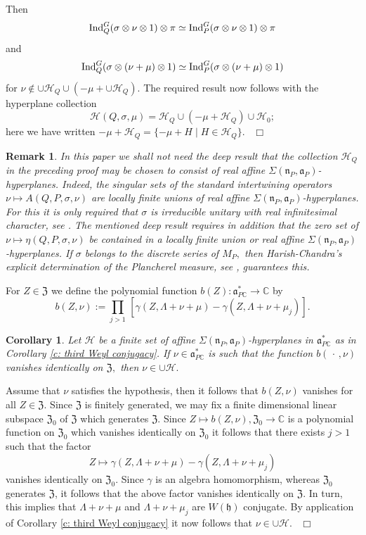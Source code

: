 \documentclass[12pt,a4paper]{article}
\newtheorem{Cor}[Thm]{Corollary}
\newtheorem{Rem}[Thm]{Remark}
\newenvironment{cor}[0]{\begin{Cor}\noindent}%
{\end{Cor}}
\newenvironment{rem}[0]{\begin{Rem}\noindent\rm}%
{\end{Rem}}
\def\proof{\par\noindent{\it Proof.}{\ }{\ }}
\def\qed{~\hfill\hbox{$\Box$}\medbreak}
\def\msy#1{{\mathbb #1}}
\def\C{{\msy C}}
\def\gg{\gamma}
\def\gs{\sigma}
\def\gS{\Sigma}
\def\got#1{\mathfrak #1}
\def\fa{{\got a}}
\def\fh{{\got h}}
\def\fn{{\got n}}
\def\to{\rightarrow}
\def\iC{{\scriptscriptstyle \C}}
\def\cH{{\mathcal H}}
\numberwithin{Thm}{section}
\numberwithin{equation}{section}
\def\Ind{{\rm Ind}}
\def\dotvar{\, \cdot\,}
\def\fZ{{\mathfrak Z}}
\def\faPdc{{\fa_{P\iC}^*}}
\def\gL{\Lambda}
\numberwithin{equation}{section}
\def\fZ{{\mathfrak Z}}
\def\gL{\Lambda}
\def\faPdc{\fa_{P\iC}^*}
\def\fh{{\mathfrak h}}
\def\faP{\fa_P}
\def\bfhyp{hyperplanes}
\begin{document}
Then 
$$
\Ind_Q^G(\gs \otimes \nu \otimes 1) \otimes \pi \simeq \Ind_P^G(\gs \otimes \nu \otimes 1) \otimes \pi 
$$ 
and 
$$ 
\Ind_Q^G(\gs \otimes (\nu + \mu) \otimes 1)\simeq \Ind_P^G(\gs \otimes (\nu + \mu) \otimes 1)
$$ 
for $\nu \notin \cup \cH_Q \cup (-\mu + \cup \cH_Q).$ The required result now follows
with the hyperplane collection 
$$ 
\cH(Q,\gs, \mu) = \cH_Q \cup (-\mu + \cH_Q) \cup \cH_0;
$$ 
here we have written $- \mu + \cH_Q = \{-\mu + H \mid H\in \cH_Q\}$.
\qed

\begin{rem}
In this paper we shall not need the deep result that the collection 
$\cH_Q$ in the preceding proof 
may be chosen to consist of real affine $\gS(\fn_P,\faP)$-hyperplanes. 
Indeed, the singular sets of the standard intertwining 
operators $\nu \mapsto A(Q,P, \gs, \nu)$ are locally finite unions of 
real affine $\gS(\fn_P, \fa_P)$-hyperplanes. For this it is only required that 
$\gs$ is irreducible unitary with real infinitesimal character, see \cite[Thm.~6.6]{KS2}. 
The mentioned deep result  requires in addition that the zero set of $\nu \mapsto \eta(Q,P,\gs,\nu)$ 
be contained in a locally finite union or real affine $\gS(\fn_P,\faP)$-hyperplanes.
If $\gs$ belongs to the discrete series of $M_P,$ then Harish-Chandra's
explicit determination of the Plancherel measure, see 
\cite[Lemma 35.3]{HCha3}, guarantees this.
\end{rem} 





For $Z \in \fZ$ we define the polynomial function
$b(Z) : \faPdc \to \C$ by 
$$ 
b(Z, \nu):= \prod_{j > 1} \, [\gg(Z, \gL + \nu +\mu) - \gg(Z, \gL + \nu + \mu_j)].
$$ 
\begin{cor}
\label{c: vanishing of b}
Let $\cH$ be a finite set of affine $\gS(\fn_P,\fa_P)$-{\bfhyp}
in $\faPdc$ as in Corollary \ref{c: third Weyl conjugacy}. If  $\nu \in \faPdc$ is such that 
the function $b(\dotvar, \nu)$  vanishes identically on $\fZ,$ then $\nu \in \cup \cH.$ 
\end{cor}

\proof
Assume that $\nu$ satisfies the hypothesis, then it follows that $b(Z, \nu)$ vanishes for all $Z \in \fZ.$ 
Since $\fZ$ is finitely generated, we may fix a finite dimensional 
linear subspace $\fZ_0$  of $\fZ$ which generates $\fZ.$ Since $Z \mapsto b(Z,\nu), \fZ_0 \to \C$ 
is a polynomial function on $\fZ_0$ which vanishes identically on $\fZ_0$ it follows that there exists $j > 1$ such that 
the factor
$$ 
Z \mapsto \gg(Z, \gL +\nu + \mu) - \gg(Z, \gL +\nu +\mu_j)
$$ 
vanishes identically on $\fZ_0.$ Since $\gg$ is an algebra homomorphism,
whereas $\fZ_0$ generates $\fZ$, it follows that the above factor 
vanishes identically on $\fZ.$ In turn, this implies that 
$\gL +\nu + \mu$ and $\gL +\nu +\mu_j$ are $W(\fh)$ conjugate. By application of Corollary \ref{c: third Weyl conjugacy} it now follows that $\nu \in \cup \cH.$ 
\qed
\end{document}
